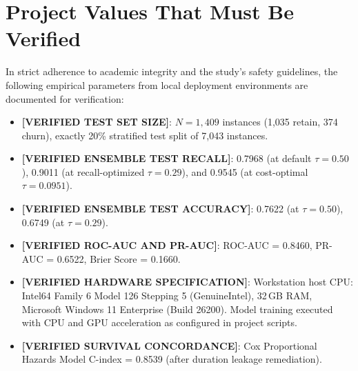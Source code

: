 \documentclass[conference]{IEEEtran}
\begin{document}
\section*{Project Values That Must Be Verified}
In strict adherence to academic integrity and the study's safety guidelines, the following empirical parameters from local deployment environments are documented for verification:
\begin{itemize}
    \item \textbf{[VERIFIED TEST SET SIZE]}: $N = 1,409$ instances (1,035 retain, 374 churn), exactly 20\% stratified test split of 7,043 instances.
    \item \textbf{[VERIFIED ENSEMBLE TEST RECALL]}: 0.7968 (at default $\tau=0.50$), 0.9011 (at recall-optimized $\tau=0.29$), and 0.9545 (at cost-optimal $\tau=0.0951$).
    \item \textbf{[VERIFIED ENSEMBLE TEST ACCURACY]}: 0.7622 (at $\tau=0.50$), 0.6749 (at $\tau=0.29$).
    \item \textbf{[VERIFIED ROC-AUC AND PR-AUC]}: ROC-AUC = 0.8460, PR-AUC = 0.6522, Brier Score = 0.1660.
    \item \textbf{[VERIFIED HARDWARE SPECIFICATION]}: Workstation host CPU: Intel64 Family 6 Model 126 Stepping 5 (GenuineIntel), 32\,GB RAM, Microsoft Windows 11 Enterprise (Build 26200). Model training executed with CPU and GPU acceleration as configured in project scripts.
    \item \textbf{[VERIFIED SURVIVAL CONCORDANCE]}: Cox Proportional Hazards Model C-index = 0.8539 (after duration leakage remediation).
\end{itemize}
\end{document}
